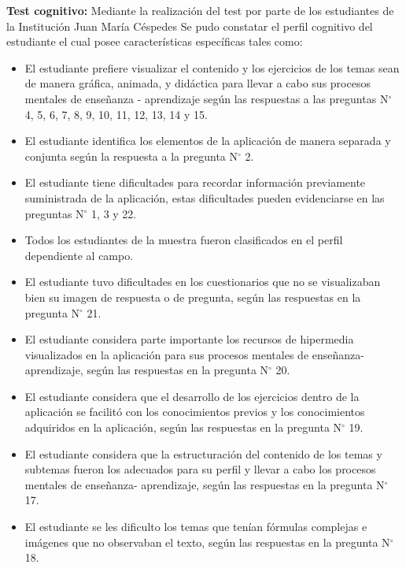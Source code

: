 \textbf{Test cognitivo:} Mediante la realización del test por parte de los estudiantes de la Institución Juan María Céspedes Se pudo constatar el perfil cognitivo del estudiante el cual posee características específicas tales como:
\begin{itemize}

    \item El estudiante prefiere visualizar el contenido y los ejercicios de los temas sean de manera gráfica, animada, y didáctica para llevar a cabo sus procesos mentales de enseñanza - aprendizaje según las respuestas a las preguntas N$^{\circ}$ 4, 5, 6, 7, 8, 9, 10, 11, 12, 13, 14 y 15.

    \item El estudiante identifica los elementos de la aplicación de manera separada y conjunta según la respuesta a la pregunta N$^{\circ}$ 2.

    \item El estudiante tiene dificultades para recordar información previamente suministrada de la aplicación, estas dificultades pueden evidenciarse en las preguntas N$^{\circ}$ 1, 3 y 22.

    \item Todos los estudiantes de la muestra fueron clasificados en el perfil dependiente al campo.

    \item El estudiante tuvo dificultades en los cuestionarios que no se visualizaban bien su imagen de respuesta o de pregunta, según las respuestas en la pregunta N$^{\circ}$ 21.
    
    \item El estudiante considera parte importante los recursos de hipermedia visualizados en la aplicación para sus procesos mentales de enseñanza- aprendizaje, según las respuestas en la pregunta N$^{\circ}$ 20.
    
    \item El estudiante considera que el desarrollo de los ejercicios dentro de la aplicación se facilitó con los conocimientos previos y los conocimientos adquiridos en la aplicación, según las respuestas en la pregunta N$^{\circ}$ 19.

    \item El estudiante considera que la estructuración del contenido de los temas y subtemas fueron los adecuados para su perfil y llevar a cabo los procesos mentales de enseñanza- aprendizaje, según las respuestas en la pregunta N$^{\circ}$ 17.

    \item El estudiante se les dificulto los temas que tenían fórmulas complejas e imágenes que no observaban el texto, según las respuestas en la pregunta N$^{\circ}$ 18.

\end{itemize}
